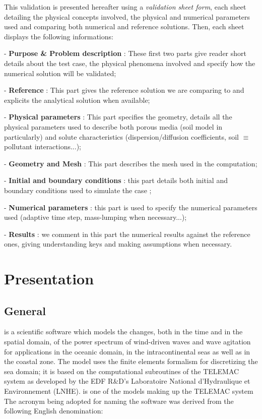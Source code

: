 This validation is presented hereafter using a \textit{validation sheet form},
each sheet detailing the physical concepts involved, the physical and numerical parameters used and comparing both numerical and reference solutions.
Then, each sheet displays the following informations:
\begin{list}{-}{}
\item [-] \textbf{Purpose \& Problem description} : These first two parts give reader short details about the test case, the physical phenomena involved and specify how the numerical solution will be validated;
\item [-] \textbf{Reference} : This part gives the reference solution we are comparing to and explicits the analytical solution when available;
\item [-] \textbf{Physical parameters} : This part specifies the geometry,
details all the physical parameters used to describe both porous media (soil model in particularly) and
solute characteristics (dispersion/diffusion coefficients, soil $\equiv$ pollutant interactions...);
\item [-] \textbf{Geometry and Mesh} : This part describes the mesh used in the \tomawac computation;
\item [-] \textbf{Initial and boundary conditions} : this part details both initial and boundary conditions used to simulate the case ;
\item [-] \textbf{Numerical parameters} : this part is used to specify the numerical parameters used
(adaptive time step, mass-lumping when necessary...);
\item [-] \textbf{Results} : we comment in this part the numerical results against the reference ones,
giving understanding keys and making assumptions when necessary.
\end{list}
%
\bigskip
%
\clearpage
\chapter{Presentation}
\section{General}
\tomawac is a scientific software which models the changes, both in the time and in the spatial domain, of the power spectrum of wind-driven waves and wave agitation for applications in the oceanic domain, in the intracontinental seas as well as in the coastal zone. The model uses the finite elements formalism for discretizing the sea domain; it is based on the computational subroutines of the TELEMAC system as developed by the EDF R\&D’s Laboratoire National d'Hydraulique et Environnement (LNHE). \tomawac is one of the models making up the TELEMAC system 
The acronym \tomawac being adopted for naming the software was derived from the following English denomination:

